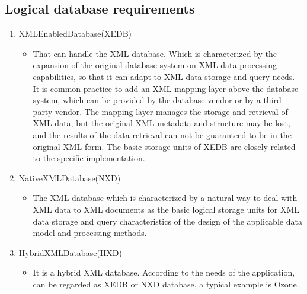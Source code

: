 \subsection{Logical database requirements}

\begin{enumerate}
    \item XMLEnabledDatabase(XEDB)
    \begin{itemize}
        \item {
          That can handle the XML database.
          Which is characterized by the expansion of the original database system on XML data processing capabilities, so that it can adapt to XML data storage and query needs.
          It is common practice to add an XML mapping layer above the database system, which can be provided by the database vendor or by a third-party vendor.
          The mapping layer manages the storage and retrieval of XML data, but the original XML metadata and structure may be lost, and the results of the data retrieval can not be guaranteed to be in the original XML form.
          The basic storage units of XEDB are closely related to the specific implementation.
        }
    \end{itemize}
    \item NativeXMLDatabase(NXD)
    \begin{itemize}
        \item The XML database which is characterized by a natural way to deal with XML data to XML documents as the basic logical storage units for XML data storage and query characteristics of the design of the applicable data model and processing methods.
    \end{itemize}
    \item HybridXMLDatabase(HXD)
    \begin{itemize}
        \item{
          It is a hybrid XML database.
          According to the needs of the application, can be regarded as XEDB or NXD database, a typical example is Ozone.
        }
    \end{itemize}
\end{enumerate}

